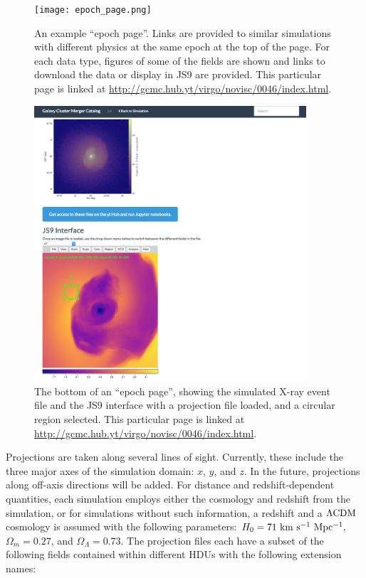 \documentclass{emulateapj}
\begin{document}
\begin{figure}
\begin{center}
\texttt{[image: epoch\_page.png]}
\caption{An example ``epoch page''. Links are provided to similar simulations with different physics at the same epoch at the top of the page. For each data type, figures of some of the fields are shown and links to download the data or display in JS9 are provided. This particular page is linked at \url{http://gcmc.hub.yt/virgo/novisc/0046/index.html}.}
\end{center}
\end{figure}

\begin{figure}
\begin{center}
\includegraphics[width=0.9\textwidth]{epoch_page2.png}
\caption{The bottom of an ``epoch page'', showing the simulated X-ray event file and the JS9 interface with a projection file loaded, and a circular region selected. This particular page is linked at \url{http://gcmc.hub.yt/virgo/novisc/0046/index.html}.}
\end{center}
\end{figure}

Projections are taken along several lines of sight. Currently, these include the three major axes of the simulation domain: $x$, $y$, and $z$. In the future, projections along off-axis directions will be added. For distance and redshift-dependent quantities, each simulation employs either the cosmology and redshift from the simulation, or for simulations without such information, a redshift and a $\Lambda{\rm CDM}$ cosmology is assumed with the following parameters: $H_0 = 71~{\rm km~s^{-1}~Mpc^{-1}},$ $\Omega_m = 0.27$, and $\Omega_\Lambda = 0.73$. The projection files each have a subset of the following fields contained within different HDUs with the following extension names:
\end{document}
